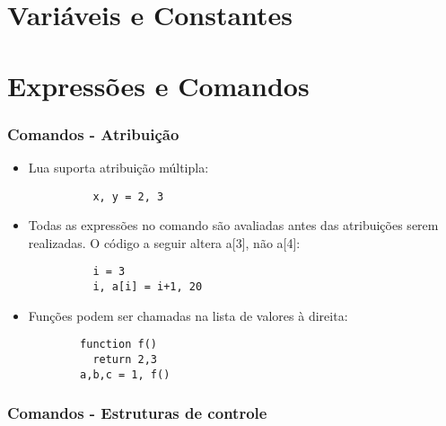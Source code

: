 \documentclass{ime-beamer}
\begin{document}
\section{Variáveis e Constantes}

\section{Expressões e Comandos}
\begin{frame}[fragile]
  \frametitle{Comandos - Atribuição}
  \begin{block}{}
    \begin{itemize}
      \item Lua suporta atribuição múltipla:
        \begin{lstlisting}
          x, y = 2, 3
        \end{lstlisting}
      \item Todas as expressões no comando são avaliadas antes das atribuições serem
        realizadas. O código a seguir altera a[3], não a[4]:
        \begin{lstlisting}
          i = 3
          i, a[i] = i+1, 20
        \end{lstlisting}
      \item Funções podem ser chamadas na lista de valores à direita:
        \begin{lstlisting}
        function f()
          return 2,3
        a,b,c = 1, f()
        \end{lstlisting}
    \end{itemize}
  \end{block}{}
\end{frame}

\begin{frame}[fragile]
  \frametitle{Comandos - Estruturas de controle}
  \begin{block}
  \end{block}
\end{frame}
\end{document}

